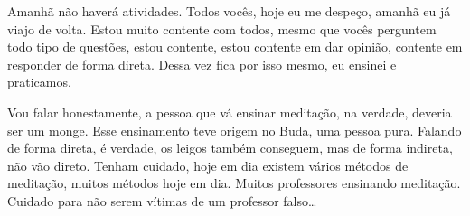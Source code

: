 Amanhã não haverá atividades. Todos vocês, hoje eu me despeço,
amanhã eu já viajo de volta. Estou muito contente com todos, mesmo que
vocês perguntem todo tipo de questões, estou contente, estou contente
em dar opinião, contente em responder de forma direta. Dessa vez fica
por isso mesmo, eu ensinei e praticamos. 

Vou falar honestamente, a pessoa que vá ensinar meditação, na
verdade, deveria ser um monge. Esse ensinamento teve origem no Buda,
uma pessoa pura. Falando de forma direta, é verdade, os leigos também
conseguem, mas de forma indireta, não vão direto. Tenham cuidado, hoje
em dia existem vários métodos de meditação, muitos métodos hoje em dia.
Muitos professores ensinando meditação. Cuidado para não serem vítimas
de um professor falso\ldots{}
